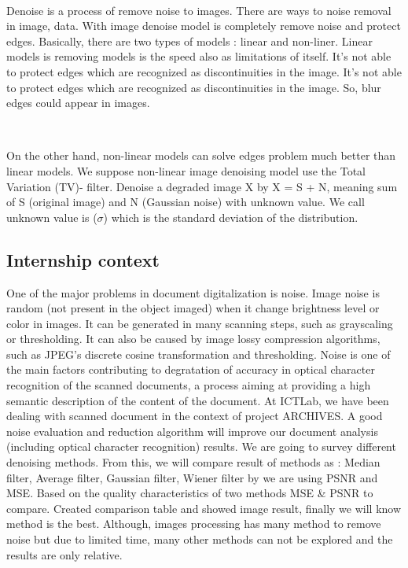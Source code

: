 \

Denoise is a process of remove noise to images. There are ways to noise removal in image, data. With image denoise model is completely remove noise and protect edges. Basically, there are two types of models : linear and non-liner. Linear models is removing models is the speed also as limitations of itself. It’s not able to protect edges which are recognized as discontinuities in the image. It's not able to protect edges which are recognized as discontinuities in the image. So, blur edges could appear in images.

\

On the other hand, non-linear models can solve edges problem much better than linear models. We suppose non-linear image denoising model use the Total Variation (TV)- filter. Denoise a degraded image X by X = S + N, meaning sum of S (original image) and N (Gaussian noise) with unknown value. We call unknown value is ($\sigma$) which is the standard deviation of the distribution.





\vspace*{1cm}




\subsection{Internship context}
One of the major problems in document digitalization is noise. Image noise is random (not present in the object imaged) when it change brightness level or color in images. It can be generated in many scanning steps, such as grayscaling or thresholding. It can also be caused by image lossy compression algorithms, such as JPEG’s discrete cosine transformation and thresholding. Noise is one of the main factors contributing to degratation of accuracy in optical character recognition of the scanned documents, a process aiming at providing a high semantic description of the content of the document. At ICTLab, we have been dealing with scanned document in the context of project ARCHIVES. A good noise evaluation and reduction algorithm will improve our document analysis (including optical character recognition) results. We are going to survey different denoising methods. From this, we will compare result of methods as : Median filter, Average filter, Gaussian filter, Wiener filter by we are using PSNR and MSE. Based on the quality characteristics of two methods MSE \& PSNR to compare. Created comparison table and showed image result, finally we will know method is the best. Although, images processing has many method to remove noise but due to limited time, many other methods can not be explored and the results are only relative.


